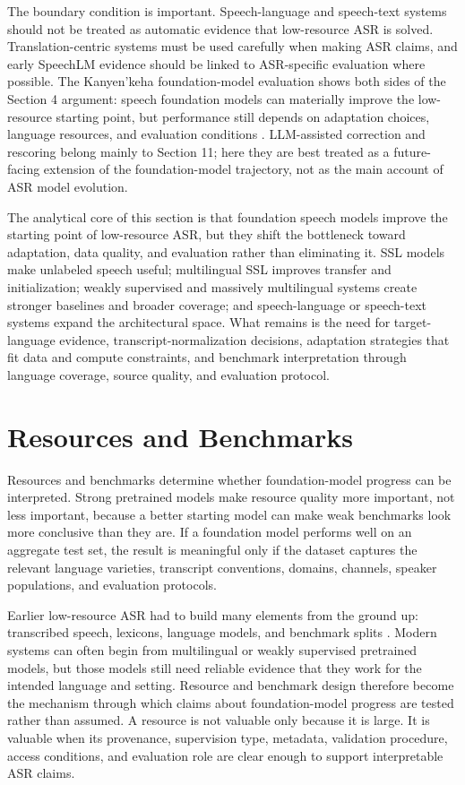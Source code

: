 \documentclass[pdflatex,sn-basic,iicol]{sn-jnl}
\theoremstyle{thmstyleone}
\theoremstyle{thmstyletwo}
\theoremstyle{thmstylethree}
\begin{document}
The boundary condition is important. Speech-language and speech-text systems should not be treated as automatic evidence that low-resource ASR is solved. Translation-centric systems must be used carefully when making ASR claims, and early SpeechLM evidence should be linked to ASR-specific evaluation where possible. The Kanyen'keha foundation-model evaluation shows both sides of the Section 4 argument: speech foundation models can materially improve the low-resource starting point, but performance still depends on adaptation choices, language resources, and evaluation conditions \citep{geng25c_interspeech}. LLM-assisted correction and rescoring belong mainly to Section 11; here they are best treated as a future-facing extension of the foundation-model trajectory, not as the main account of ASR model evolution.

The analytical core of this section is that foundation speech models improve the starting point of low-resource ASR, but they shift the bottleneck toward adaptation, data quality, and evaluation rather than eliminating it. SSL models make unlabeled speech useful; multilingual SSL improves transfer and initialization; weakly supervised and massively multilingual systems create stronger baselines and broader coverage; and speech-language or speech-text systems expand the architectural space. What remains is the need for target-language evidence, transcript-normalization decisions, adaptation strategies that fit data and compute constraints, and benchmark interpretation through language coverage, source quality, and evaluation protocol.

\section{Resources and Benchmarks}

Resources and benchmarks determine whether foundation-model progress can be interpreted. Strong pretrained models make resource quality more important, not less important, because a better starting model can make weak benchmarks look more conclusive than they are. If a foundation model performs well on an aggregate test set, the result is meaningful only if the dataset captures the relevant language varieties, transcript conventions, domains, channels, speaker populations, and evaluation protocols.

Earlier low-resource ASR had to build many elements from the ground up: transcribed speech, lexicons, language models, and benchmark splits \citep{besacier2014_underresourced_asr_survey,gales2014_babel_project_research_cued}. Modern systems can often begin from multilingual or weakly supervised pretrained models, but those models still need reliable evidence that they work for the intended language and setting. Resource and benchmark design therefore become the mechanism through which claims about foundation-model progress are tested rather than assumed. A resource is not valuable only because it is large. It is valuable when its provenance, supervision type, metadata, validation procedure, access conditions, and evaluation role are clear enough to support interpretable ASR claims.
\end{document}
